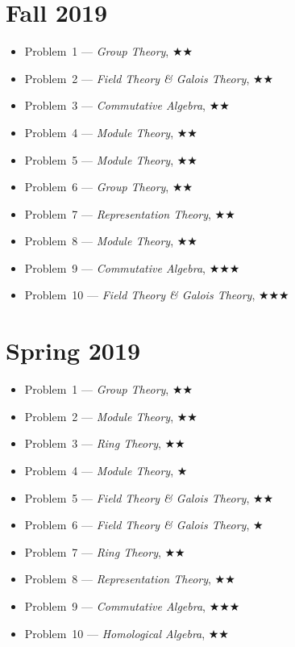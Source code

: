 \documentclass[11pt,letterpaper]{book}
\begin{document}
\section*{Fall 2019}
\begin{itemize}
\item Problem~1 --- \textit{Group Theory}, $\bigstar\bigstar$
\item Problem~2 --- \textit{Field Theory \& Galois Theory}, $\bigstar\bigstar$
\item Problem~3 --- \textit{Commutative Algebra}, $\bigstar\bigstar$
\item Problem~4 --- \textit{Module Theory}, $\bigstar\bigstar$
\item Problem~5 --- \textit{Module Theory}, $\bigstar\bigstar$
\item Problem~6 --- \textit{Group Theory}, $\bigstar\bigstar$
\item Problem~7 --- \textit{Representation Theory}, $\bigstar\bigstar$
\item Problem~8 --- \textit{Module Theory}, $\bigstar\bigstar$
\item Problem~9 --- \textit{Commutative Algebra}, $\bigstar\bigstar\bigstar$
\item Problem~10 --- \textit{Field Theory \& Galois Theory}, $\bigstar\bigstar\bigstar$
\end{itemize}

\section*{Spring 2019}
\begin{itemize}
\item Problem~1 --- \textit{Group Theory}, $\bigstar\bigstar$
\item Problem~2 --- \textit{Module Theory}, $\bigstar\bigstar$
\item Problem~3 --- \textit{Ring Theory}, $\bigstar\bigstar$
\item Problem~4 --- \textit{Module Theory}, $\bigstar$
\item Problem~5 --- \textit{Field Theory \& Galois Theory}, $\bigstar\bigstar$
\item Problem~6 --- \textit{Field Theory \& Galois Theory}, $\bigstar$
\item Problem~7 --- \textit{Ring Theory}, $\bigstar\bigstar$
\item Problem~8 --- \textit{Representation Theory}, $\bigstar\bigstar$
\item Problem~9 --- \textit{Commutative Algebra}, $\bigstar\bigstar\bigstar$
\item Problem~10 --- \textit{Homological Algebra}, $\bigstar\bigstar$
\end{itemize}
\end{document}
